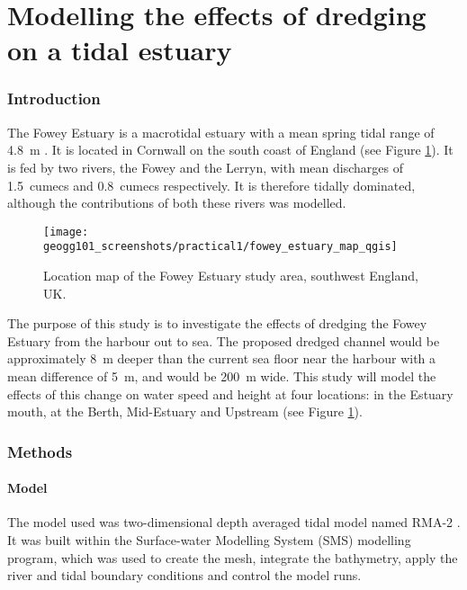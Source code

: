 \documentclass{article}
\begin{document}

\part*{Modelling the effects of dredging on a tidal estuary}

\section{Introduction}


The Fowey Estuary is a macrotidal estuary with a mean spring tidal range of \SI{4.8}{\m} \parencite{uncles2002dependence}. It is located in Cornwall on the south coast of England (see Figure \ref{fig:fowey_estuary_map}). It is fed by two rivers, the Fowey and the Lerryn, with mean discharges of \SI{1.5}{cumecs} and \SI{0.8}{cumecs} respectively.
It is therefore tidally dominated, although the contributions of both these rivers was modelled.

\begin{figure}[hbp]
    \centering
    \texttt{[image: geogg101\_screenshots/practical1/fowey\_estuary\_map\_qgis]}
    \caption{Location map of the Fowey Estuary study area, southwest England, UK. }
    \label{fig:fowey_estuary_map}
\end{figure}

The purpose of this study is to investigate the effects of dredging the Fowey Estuary from the harbour out to sea. The proposed dredged channel would be approximately \SI{8}{m} deeper than the current sea floor near the harbour with a mean difference of \SI{5}{m}, and would be \SI{200}{m} wide. This study will model the effects of this change on water speed and height at four locations: in the Estuary mouth, at the Berth,  Mid-Estuary and Upstream (see Figure \ref{fig:fowey_estuary_map}). 

\section{Methods}

\subsection{Model}

The model used was two-dimensional depth averaged tidal model named RMA-2 \parencite{king1990program}. It was built within the Surface-water Modelling System (SMS) modelling program, which was used to create the mesh, integrate the bathymetry, apply the river and tidal boundary conditions and control the model runs.
\end{document}
